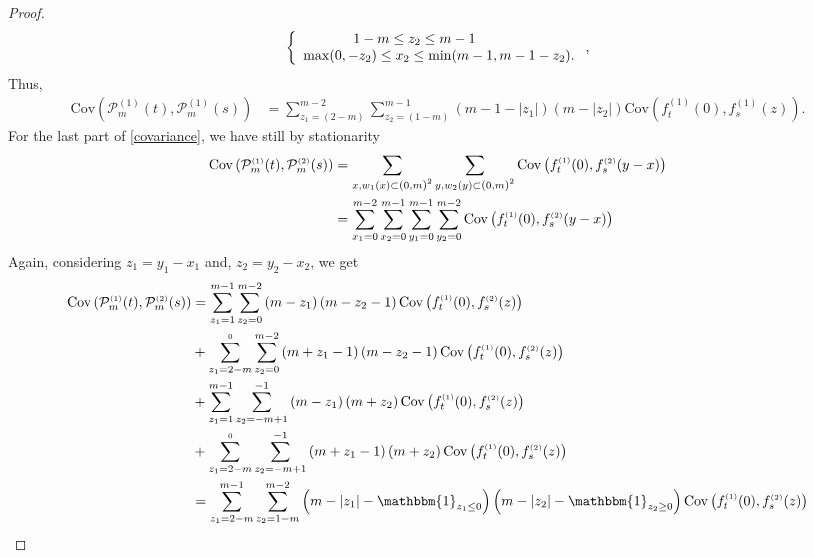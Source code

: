 \documentclass[12pt]{article}
\theoremstyle{Theorem}
\begin{document}
\begin{proof}
\begin{align*}
\left\{
\begin{array}{rcl}
1-m \leq z_2 \leq m-1 \hspace{2.5cm}  \\
\max(0, -z_2) \leq x_2 \leq \min(m-1 , m-1-z_2).
\end{array}\right., 
\end{align*}
Thus,
\begin{align*}
\text{Cov}\left(\mathcal{P}_{m}^{\scriptscriptstyle (1)}(t),\mathcal{P}_{m}^{\scriptscriptstyle (1)}(s) \right) &  = \sum_{z_{\scriptscriptstyle 1} = \left(2-m\right)}^{m-2}\sum_{z_{\scriptscriptstyle 2}=\left(1-m\right)}^{m-1}\left(m -1 -|z_{1}|\right)\left(m - |z_{2}|\right) \text{Cov}\left(f_{t}^{\scriptscriptstyle (1)}(0), f_{s}^{\scriptscriptstyle (1)}(z) \right). 
\end{align*}
For the last part of \eqref{covariance}, we have still by stationarity
\begin{align*}
\text{Cov}\left(\mathcal{P}_{m}^{\scriptscriptstyle (1)}(t),\mathcal{P}_{m}^{\scriptscriptstyle (2)}(s) \right) & = \sum_{x, w_{1}(x) \subset \text{\larger[1]{$($}}0, m \text{\larger[1]{$)$}}^{2}} \sum_{y, w_{2}(y) \subset \text{\larger[1]{$($}}0, m \text{\larger[1]{$)$}}^{2}} \text{Cov}\left(f_{t}^{\scriptscriptstyle (1)}(0), f_{s}^{ \scriptscriptstyle (2)}(y-x) \right)\\
& =  \sum_{x_1 = 0}^{m-2}\sum_{x_2 = 0}^{m-1}\sum_{y_1 = 0}^{m-1}\sum_{y_2 = 0}^{m-2}\text{Cov}\left(f_{t}^{\scriptscriptstyle (1)}(0), f_{s}^{ \scriptscriptstyle (2)}(y-x) \right)
\end{align*}
Again, considering $z_1 = y_1 - x_1$ and, $z_{2} = y_{2}-x_{2}$, we get
\begin{align*}
\text{Cov}\left(\mathcal{P}_{m}^{\scriptscriptstyle (1)}(t),\mathcal{P}_{m}^{\scriptscriptstyle (2)}(s) \right) & = \sum_{z_1=1}^{m-1}\sum_{z_2 = 0}^{m-2}\left(m-z_1\right)\left(m-z_2-1\right)\text{Cov}\left(f_{t}^{\scriptscriptstyle (1)}(0), f_{s}^{ \scriptscriptstyle (2)}(z) \right)\\
& +  \sum_{z_1=2-m}^{\scriptscriptstyle 0}\sum_{z_2 = 0}^{m-2}\left(m+z_1-1\right)\left(m-z_2-1\right)\text{Cov}\left(f_{t}^{\scriptscriptstyle (1)}(0), f_{s}^{ \scriptscriptstyle (2)}(z) \right)\\
& +  \sum_{z_1=1}^{m-1}\sum_{z_2 = -m+1}^{-1}\left(m-z_1\right)\left(m+z_2\right)\text{Cov}\left(f_{t}^{\scriptscriptstyle (1)}(0), f_{s}^{ \scriptscriptstyle (2)}(z) \right)\\
& + \sum_{z_1=2-m}^{\scriptscriptstyle 0}\sum_{z_2 = -m+1}^{-1} \left(m+z_1-1\right)\left(m+z_2\right)\text{Cov}\left(f_{t}^{\scriptscriptstyle (1)}(0), f_{s}^{ \scriptscriptstyle (2)}(z) \right) \\
& = \sum_{z_1=2-m}^{m-1} \sum_{z_2 = 1-m}^{m-2} \left(m-|z_1| - \mathbbm{1}_{z_{1} \leq 0}\right)\left(m-|z_2|-\mathbbm{1}_{z_{2} \geq 0}\right)\text{Cov}\left(f_{t}^{\scriptscriptstyle (1)}(0), f_{s}^{ \scriptscriptstyle (2)}(z) \right)
\end{align*}
\end{proof}
\end{document}
